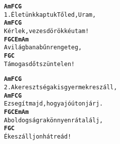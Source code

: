 \begin{minipage}{\textwidth}
\begin{multicols}{2}
\begin{minipage}{\textwidth}
\begin{alltt}
\textbf{   Am  F    C              G}
1. Életünk kaptuk Tőled, Uram,
\textbf{    Am        F   C        G}
   Kérlek, vezesd örökké utam!
\textbf{      F          G   C Em Am}
   A világban a bűn rengeteg,
\textbf{    F   G             C}
   Támogasd őt szüntelen!
\end{alltt}
\vspace{0.0cm}
\versszakspacing
\end{minipage}
\begin{minipage}{\textwidth}
\begin{alltt}
\textbf{   Am        F     C             G}
2. A keresztség a kisgyermekre száll,
\textbf{   Am        F            C       G}
   Ez segít majd, hogy a jó úton járj.
\textbf{      F           G       C Em Am}
   A boldogságra könnyen rátalálj,
\textbf{   F     G            C}
   Éke szálljon hát reád!
\end{alltt}
\vspace{0.0cm}
\versszakspacing
\end{minipage}
\vspace{0.2cm}
\end{multicols}

\end{minipage}
~\vspace{1.0cm}
\newline
